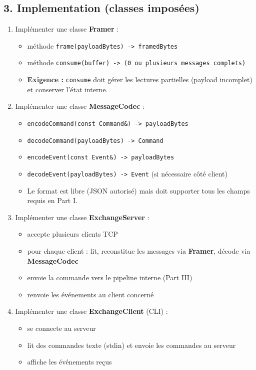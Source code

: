 \documentclass[11pt,a4paper]{article}
\begin{document}
\subsection*{3. Implementation (classes imposées)}
\begin{enumerate}
  \item Implémenter une classe \textbf{Framer} :
  \begin{itemize}
    \item méthode \texttt{frame(payloadBytes) -> framedBytes}
    \item méthode \texttt{consume(buffer) -> (0 ou plusieurs messages complets)}
    \item \textbf{Exigence :} \texttt{consume} doit gérer les lectures partielles (payload incomplet) et conserver l’état interne.
  \end{itemize}

  \item Implémenter une classe \textbf{MessageCodec} :
  \begin{itemize}
    \item \texttt{encodeCommand(const Command\&) -> payloadBytes}
    \item \texttt{decodeCommand(payloadBytes) -> Command}
    \item \texttt{encodeEvent(const Event\&) -> payloadBytes}
    \item \texttt{decodeEvent(payloadBytes) -> Event} (si nécessaire côté client)
    \item Le format est libre (JSON autorisé) mais doit supporter tous les champs requis en Part I.
  \end{itemize}

  \item Implémenter une classe \textbf{ExchangeServer} :
  \begin{itemize}
    \item accepte plusieurs clients TCP
    \item pour chaque client : lit, reconstitue les messages via \textbf{Framer}, décode via \textbf{MessageCodec}
    \item envoie la commande vers le pipeline interne (Part III)
    \item renvoie les événements au client concerné
  \end{itemize}

  \item Implémenter une classe \textbf{ExchangeClient} (CLI) :
  \begin{itemize}
    \item se connecte au serveur
    \item lit des commandes texte (stdin) et envoie les commandes au serveur
    \item affiche les événements reçus
  \end{itemize}
\end{enumerate}
\end{document}
